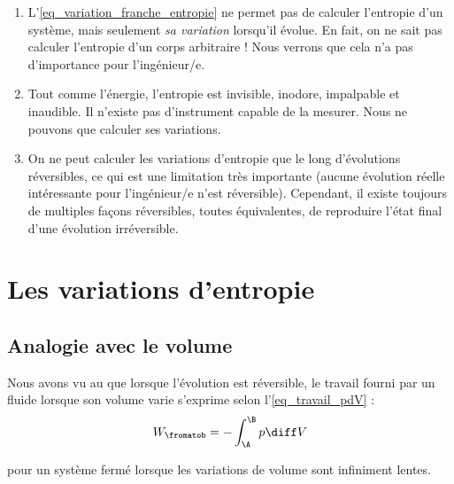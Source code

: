 			\begin{enumerate}
			
				\item L’\cref{eq_variation_franche_entropie} ne permet pas de calculer l’entropie d’un système, mais seulement \emph{sa variation} lorsqu’il évolue. En fait, on ne sait pas calculer l’entropie d’un corps arbitraire ! Nous verrons que cela n’a pas d’importance pour l’ingénieur/e.
		
				\item Tout comme l’énergie, l’entropie est invisible, inodore, impalpable et inaudible. Il n’existe pas d’instrument capable de la mesurer. Nous ne pouvons que calculer ses variations.

				\item On ne peut calculer les variations d’entropie que le long d’évolutions réversibles, ce qui est une limitation très importante (aucune évolution réelle intéressante pour l’ingénieur/e n’est réversible). Cependant, il existe toujours de multiples façons réversibles, toutes équivalentes, de reproduire l’état final d’une évolution irréversible. 
				
			\end{enumerate}
			

\section{Les variations d’entropie}
\label{ch_variations_entropie}

	\subsection{Analogie avec le volume}
	
		Nous avons vu au \coursdeux que lorsque l’évolution est réversible, le travail fourni par un fluide lorsque son volume varie s’exprime selon l’\cref{eq_travail_pdV} :
		\begin{equation}
			W_\fromatob = -\int_\A^\B p \diff V
		\end{equation}
		\begin{equationterms}
			\item pour un système fermé lorsque les variations de volume sont infiniment lentes.
		\end{equationterms}

